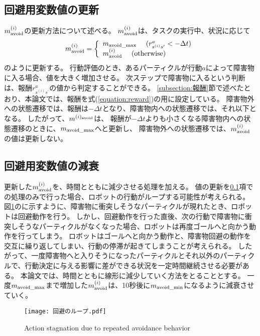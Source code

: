 \subsection{回避用変数値の更新} \label{subsection:回避用変数値の更新}
$m^{(i)}_{\rm avoid}$の更新方法について述べる。
$m^{(i)}_{\rm avoid}$は、タスクの実行中、状況に応じて
\begin{equation}
\label{equation:reward}
  m^{(i)}_{\rm avoid} =
  \left\{
    \begin{array}{l}
      m_{\rm avoid\_max} \ \ \ \ (r^{a}_{s^{(i)}s^{\prime}} < - \Delta t) \\
      m^{(i)}_{\rm avoid} \ \ \ \ ({\rm otherwise})
    \end{array}
  \right.
\end{equation}
のように更新する。
行動評価のとき、あるパーティクルが行動$a$によって障害物に入る場合、値を大きく増加させる。
次ステップで障害物に入るという判断は、報酬$r^{a}_{s^{(i)}s^{\prime}}$の値から判定することができる。
\ref{subsection:報酬}節で述べたとおり、本論文では、報酬を式(\ref{equation:reward})の用に設定している。
障害物外への状態遷移では、報酬は$-\Delta t$となり、障害物内への状態遷移では、それ以下となる。
したがって、$m^{(i)_{\rm avoid}}$は、
報酬が$-\Delta t$よりも小さくなる障害物内への状態遷移のときに、$m_{\rm avoid\_max}$へと更新し、
障害物外への状態遷移では、$m^{(i)}_{\rm avoid}$の値は更新しない。

\subsection{回避用変数値の減衰}
更新した$m^{(i)}_{\rm avoid}$を、時間とともに減少させる処理を加える。
値の更新を\ref{subsection:回避用変数値の更新}項での処理のみで行った場合、ロボットの行動がループする可能性が考えられる。
図\ref{fig:回避のループ}のに示すように、障害物に衝突しそうなパーティクルが現れたとき、ロボットは回避動作を行う。
しかし、回避動作を行った直後、次の行動で障害物に衝突しそうなパーティクルがなくなった場合、ロボットは再度ゴールへと向かう動作を行ってしまう。
ロボットはゴールへと向かう動作と、障害物回避の動作を交互に繰り返してしまい、行動の停滞が起きてしまうことが考えられる。
したがって、一度障害物へと入りそうになったパーティクルとそれ以外のパーティクルで、行動決定に与える影響に差ができる状況を一定時間継続させる必要がある。
本論文では、時間とともに線形に減少していく方法をとることとする。
一度$m_{\rm avoid\_max}$まで増加した$m^{(i)}_{\rm avoid}$は、10秒後に$m_{\rm avoid\_min}$になるように減衰させていく。

\begin{figure}[h]
  \begin{center}
    \texttt{[image: 回避のループ.pdf]}
    \caption{Action stagnation due to repeated avoidance behavior}
    \label{fig:回避のループ}
  \end{center}
\end{figure}
